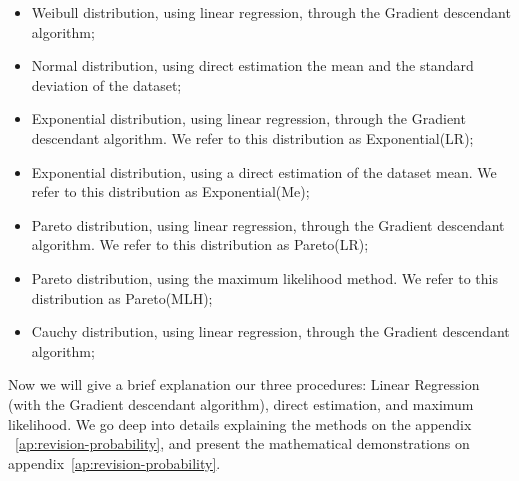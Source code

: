 \begin{itemize}
	\item Weibull distribution, using linear regression, through the Gradient descendant algorithm;
	\item Normal distribution, using direct estimation the mean and the standard deviation of the dataset;
	\item Exponential distribution, using linear regression, through the Gradient descendant algorithm. We refer to this distribution as Exponential(LR);
	\item Exponential distribution, using a direct estimation of the dataset mean. We refer to this distribution as Exponential(Me);
	\item Pareto distribution, using linear regression, through the Gradient descendant algorithm. We refer to this distribution as Pareto(LR);
	\item Pareto distribution, using the maximum likelihood method. We refer to this distribution as Pareto(MLH);
	\item Cauchy distribution, using linear regression, through the Gradient descendant algorithm;
\end{itemize}







Now we will give a brief explanation our three procedures: Linear Regression (with the  Gradient descendant algorithm), direct estimation, and maximum likelihood. We go deep into details explaining the methods on the appendix ~\ref{ap:revision-probability}, and present the mathematical demonstrations on appendix~\ref{ap:revision-probability}. 

